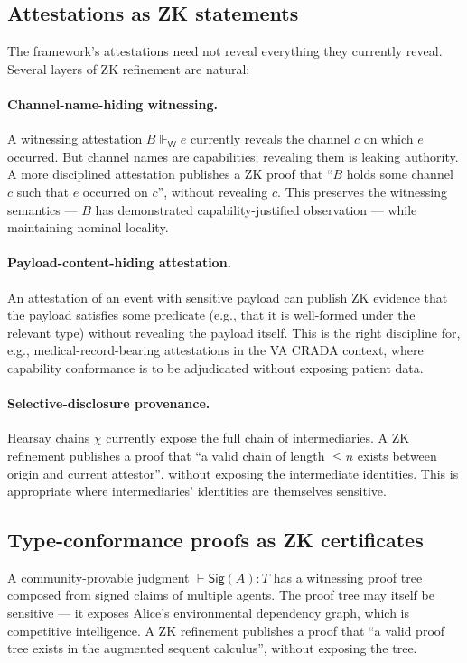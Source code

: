 \documentclass[11pt]{article}
\theoremstyle{definition}
\theoremstyle{plain}
\theoremstyle{remark}
\newcommand{\Sig}{\mathsf{Sig}}
\newcommand{\Att}{\mathrel{\Vdash}}
\newcommand{\AttW}{\Att_{\!\mathsf{W}}}
\begin{document}
\subsection{Attestations as ZK statements}

The framework's attestations need not reveal everything they currently reveal. Several layers of ZK refinement are natural:

\paragraph{Channel-name-hiding witnessing.} A witnessing attestation $B \AttW e$ currently reveals the channel $c$ on which $e$ occurred. But channel names are capabilities; revealing them is leaking authority. A more disciplined attestation publishes a ZK proof that ``$B$ holds some channel $c$ such that $e$ occurred on $c$'', without revealing $c$. This preserves the witnessing semantics --- $B$ has demonstrated capability-justified observation --- while maintaining nominal locality.

\paragraph{Payload-content-hiding attestation.} An attestation of an event with sensitive payload can publish ZK evidence that the payload satisfies some predicate (e.g., that it is well-formed under the relevant type) without revealing the payload itself. This is the right discipline for, e.g., medical-record-bearing attestations in the VA CRADA context, where capability conformance is to be adjudicated without exposing patient data.

\paragraph{Selective-disclosure provenance.} Hearsay chains $\chi$ currently expose the full chain of intermediaries. A ZK refinement publishes a proof that ``a valid chain of length $\leq n$ exists between origin and current attestor'', without exposing the intermediate identities. This is appropriate where intermediaries' identities are themselves sensitive.

\subsection{Type-conformance proofs as ZK certificates}

A community-provable judgment $\vdash \Sig(A) : T$ has a witnessing proof tree composed from signed claims of multiple agents. The proof tree may itself be sensitive --- it exposes Alice's environmental dependency graph, which is competitive intelligence. A ZK refinement publishes a proof that ``a valid proof tree exists in the augmented sequent calculus'', without exposing the tree.
\end{document}

